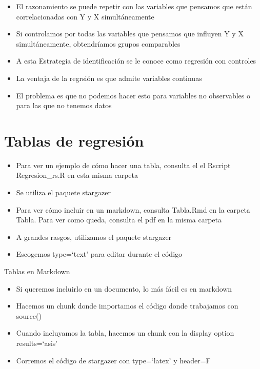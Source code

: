\documentclass[
  ignorenonframetext,
]{beamer}
\providecommand{\tightlist}{%
  \setlength{\itemsep}{0pt}\setlength{\parskip}{0pt}}
\begin{document}
\begin{frame}{}
\protect\hypertarget{section-41}{}
\begin{itemize}
\tightlist
\item
  El razonamiento se puede repetir con las variables que pensamos que
  están correlacionadas con Y y X simultáneamente
\item
  Si controlamos por todas las variables que pensamos que influyen Y y X
  simultáneamente, obtendríamos grupos comparables
\item
  A esta Estrategia de identificación se le conoce como regresión con
  controles
\item
  La ventaja de la regrsión es que admite variables continuas
\item
  El problema es que no podemos hacer esto para variables no observables
  o para las que no tenemos datos
\end{itemize}
\end{frame}

\hypertarget{tablas-de-regresiuxf3n}{%
\section{Tablas de regresión}\label{tablas-de-regresiuxf3n}}

\begin{frame}{}
\protect\hypertarget{section-42}{}
\begin{itemize}
\item
  Para ver un ejemplo de cómo hacer una tabla, consulta el el Rscript
  Regresion\_rs.R en esta misma carpeta
\item
  Se utiliza el paquete stargazer
\item
  Para ver cómo incluir en un markdown, consulta Tabla.Rmd en la carpeta
  Tabla. Para ver como queda, consulta el pdf en la misma carpeta
\end{itemize}
\end{frame}

\begin{frame}{}
\protect\hypertarget{section-43}{}
\begin{itemize}
\tightlist
\item
  A grandes rasgos, utilizamos el paquete stargazer
\item
  Escogemos type=`text' para editar durante el código
\end{itemize}
\end{frame}

\begin{frame}{Tablas en Markdown}
\protect\hypertarget{tablas-en-markdown}{}
\begin{itemize}
\tightlist
\item
  Si queremos incluirlo en un documento, lo más fácil es en markdown
\item
  Hacemos un chunk donde importamos el código donde trabajamos con
  source()
\item
  Cuando incluyamos la tabla, hacemos un chunk con la display option
  results=`asis'
\item
  Corremos el código de stargazer con type=`latex' y header=F
\end{itemize}
\end{frame}
\end{document}
